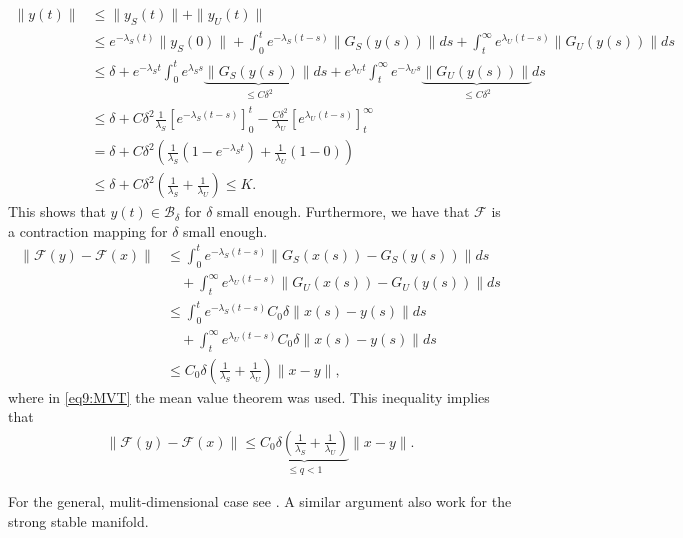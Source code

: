 \begin{enumerate}
\begin{subequations}
\begin{align}
	\|y(t)\| &\leq \| y_{S}(t)\| + \|y_{U}(t) \| \\
		 &\leq e^{-\lambda _{S}(t)}\| y_{S}(0)\| + \int_{0}^{t} e^{-\lambda _{S}(t-s)}{\| G_{S}(y(s))\|} ds + \int_{t}^{\infty } e^{\lambda _{U}(t-s)}{\|G_{U}(y(s))\|}ds \\
		 &\leq \delta + e^{-\lambda _{S}t}\int_{0}^{t} e^{\lambda _{S}s}\underbrace{\| G_{S}(y(s))\|}_{\leq C\delta^{2}} ds + e^{\lambda _{U}t}\int_{t}^{\infty } e^{-\lambda _{U}s}\underbrace{\|G_{U}(y(s))\|}_{\leq C\delta ^{2}}ds \\
		 &\leq \delta + C\delta^{2} \frac{1}{\lambda_{S}} \left[ e^{-\lambda _{S}(t-s)}\right]_{0}^{t} - \frac{C \delta^2}{\lambda _{U}} \left[ e^{\lambda _{U}(t-s)}\right]_{t}^{\infty } \\
		 &= \delta + C \delta^{2} \left( \frac{1}{\lambda_{S}}\left(1 - e^{-\lambda _{S}t}\right) + \frac{1}{\lambda _{U}}\left(1-0\right) \right) \\
		 &\leq \delta + C \delta^{2} \left( \frac{1}{\lambda _S} + \frac{1}{\lambda _U}\right) \leq K.
\end{align}
\end{subequations}
This shows that $y(t) \in \mathcal{B}_{\delta}$ for $\delta$ small enough. Furthermore, we have that $\mathcal{F}$ is a contraction mapping for $\delta$ small enough.
\begin{align}
	\|\mathcal{F}(y) - \mathcal{F}(x)\| &\leq \int_{0}^{t} e^{-\lambda_{S}(t-s)}\| G_{S}(x(s)) - G_{S}(y(s))\| ds \\
					    &\quad + \int_{t}^{\infty } e^{\lambda _{U}(t-s)} \| G_{U}(x(s)) - G_{U}(y(s)) \| ds \\
					    &\leq \int_{0}^{t} e^{-\lambda _{S}(t-s)}C_0 \delta \| x(s) - y(s)\| ds \\
					    &\quad + \int_{t}^{\infty } e^{\lambda _{U}(t-s)}C_0 \delta \|x(s) - y(s)\| ds \label{eq9:MVT}\\
					    &\leq C_0 \delta \left(\frac{1}{\lambda _{S}} + \frac{1}{\lambda _{U}} \right) \| x - y\|,
\end{align}
where in \eqref{eq9:MVT} the mean value theorem was used. This inequality implies that
\begin{align}
	\|\mathcal{F}(y) - \mathcal{F}(x) \| \leq \underbrace{C_0 \delta \left( \frac{1}{\lambda_S} + \frac{1}{\lambda _{U}}\right) }_{\leq q < 1} \| x - y\|.
\end{align}
\end{enumerate}
For the general, mulit-dimensional case see \cite{Chicone}. A similar argument also work for the strong stable manifold.

